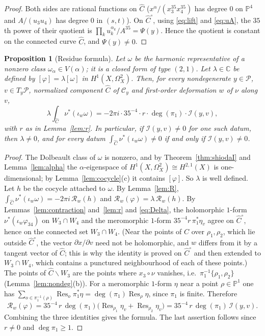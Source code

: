 \documentclass[11pt]{amsart}
\newtheorem{proposition}[theorem]{Proposition}
\theoremstyle{definition}
\theoremstyle{remark}
\numberwithin{equation}{section}
\newcommand{\C}{\mathbb{C}}
\newcommand{\PP}{\mathbb{P}}
\newcommand{\cP}{\mathcal{P}}
\newcommand{\cC}{\mathcal{C}}
\newcommand{\cI}{\mathcal{I}}
\newcommand{\cR}{\mathcal{R}}
\newcommand{\Res}{\mathop{\mathrm{Res}}\nolimits}
\newcommand{\sm}{\smallsetminus}
\begin{document}
\begin{proof}
Both sides are rational functions on $\widehat C$ ($x^\alpha/(x_3^{35}x_4^{35})$ has degree $0$ on $\PP^4$ and $A/(u_3u_4)$ has degree $0$ in $(s,t)$). On $\widehat C^\circ$, using \eqref{eq:lift} and \eqref{eq:uA}, the $35$th power of their quotient is $\prod_ku_k^{\alpha_k}/A^{35}=\Psi(y)$. Hence the quotient is constant on the connected curve $\widehat C$, and $\Psi(y)\ne0$.
\end{proof}

\begin{proposition}[Residue formula]\label{prop:residue}
Let $\omega$ be the harmonic representative of a nonzero class $\omega_\alpha\in V(\alpha)$; it is a closed form of type $(2,1)$. Let $\lambda\in\C$ be defined by $[\varphi]=\lambda[\omega]$ in $H^1(X,\Omega^2_X)$. Then, for every nondegenerate $y\in\cP$, $v\in T_y\cP$, normalized component $\widehat C$ of $\cC_y$ and first-order deformation $w$ of $\nu$ along $v$,
\[
\lambda\int_{\widehat C}\nu^*(\iota_w\omega)=-2\pi i\cdot35^{-4}\cdot r\cdot\deg(\pi_1)\cdot\cI(y,v),
\]
with $r$ as in Lemma~\ref{lem:r}. In particular, if $\cI(y,v)\ne0$ for one such datum, then $\lambda\ne0$, and for every datum $\int_{\widehat C}\nu^*(\iota_w\omega)\ne0$ if and only if $\cI(y,v)\ne0$.
\end{proposition}

\begin{proof}
The Dolbeault class of $\omega$ is nonzero, and by Theorem~\ref{thm:shiodaI} and Lemma~\ref{lem:alpha} the $\alpha$-eigenspace of $H^1(X,\Omega^2_X)\cong H^{2,1}(X)$ is one-dimensional; by Lemma~\ref{lem:cocycle}(c) it contains $[\varphi]$. So $\lambda$ is well defined. Let $h$ be the cocycle attached to $\omega$. By Lemma~\ref{lem:R}, $\int_{\widehat C}\nu^*(\iota_w\omega)=-2\pi i\,\cR_w(h)$ and $\cR_w(\varphi)=\lambda\,\cR_w(h)$. By Lemmas~\ref{lem:contraction} and~\ref{lem:r} and \eqref{eq:Delta}, the holomorphic $1$-form $\nu^*(\iota_w\varphi_{34})$ on $W_3\cap W_4$ and the meromorphic $1$-form $35^{-4}r\,\pi_1^*\eta_v$ agree on $\widehat C^\circ$, hence on the connected set $W_3\cap W_4$. (Near the points of $\widehat C$ over $\rho_1,\rho_2$, which lie outside $\widehat C^\circ$, the vector $\partial x/\partial v$ need not be holomorphic, and $w$ differs from it by a tangent vector of $\widehat C$; this is why the identity is proved on $\widehat C^\circ$ and then extended to $W_3\cap W_4$, which contains a punctured neighbourhood of each of these points.) The points of $\widehat C\sm W_3$ are the points where $x_3\circ\nu$ vanishes, i.e.\ $\pi_1^{-1}\{\rho_1,\rho_2\}$ (Lemma~\ref{lem:nondeg}(b)). For a meromorphic $1$-form $\eta$ near a point $\rho\in\PP^1$ one has $\sum_{o\in\pi_1^{-1}(\rho)}\Res_o\pi_1^*\eta=\deg(\pi_1)\Res_\rho\eta$, since $\pi_1$ is finite. Therefore
\[
\cR_w(\varphi)=35^{-4}\,r\,\deg(\pi_1)\bigl(\Res_{\rho_1}\eta_v+\Res_{\rho_2}\eta_v\bigr)=35^{-4}\,r\,\deg(\pi_1)\,\cI(y,v).
\]
Combining the three identities gives the formula. The last assertion follows since $r\ne0$ and $\deg\pi_1\ge1$.
\end{proof}
\end{document}
